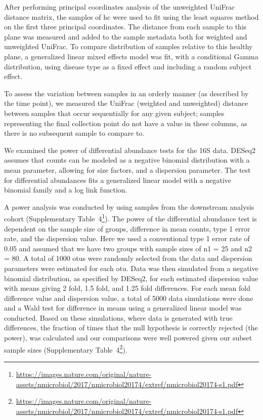 After performing principal coordinates analysis of the unweighted UniFrac distance matrix, the samples of \gls{hc} were used to fit using the least squares method on the first three principal coordinates. The distance from each sample to this plane was measured and added to the sample metadata both for weighted and unweighted UniFrac. To compare distribution of samples relative to this healthy plane, a generalized linear mixed effects model was fit, with a conditional Gamma distribution, using disease type as a fixed effect and including a random subject effect.

To assess the variation between samples in an orderly manner (as described by the time point), we measured the UniFrac (weighted and unweighted) distance between samples that occur sequentially for any given subject; samples representing the final collection point do not have a value in these columns, as there is no subsequent sample to compare to.

We examined the power of differential abundance tests for the 16S data. DESeq2 \cite{Love2014} assumes that counts can be modeled as a negative binomial distribution with a mean parameter, allowing for size factors, and a dispersion parameter. The test for differential abundances fits a generalized linear model with a negative binomial family and a log link function. 

A power analysis was conducted by using samples from the downstream analysis cohort (Supplementary Table~4\footnote{\url{https://images.nature.com/original/nature-assets/nmicrobiol/2017/nmicrobiol20174/extref/nmicrobiol20174-s1.pdf}}). The power of the differential abundance test is dependent on the sample size of groups, difference in mean counts, type 1 error rate, and the dispersion value. Here we used a conventional type 1 error rate of 0.05 and assumed that we have two groups with sample sizes of n1 = 25 and n2 = 80. A total of 1000 \glspl{otu} were randomly selected from the data and dispersion parameters were estimated for each \gls{otu}. Data was then simulated from a negative binomial distribution, as specified by DESeq2, for each estimated dispersion value with means giving 2 fold, 1.5 fold, and 1.25 fold differences. For each mean fold difference value and dispersion value, a total of 5000 data simulations were done and a Wald test for difference in means using a generalized linear model was conducted. Based on these simulations, where data is generated with true differences, the fraction of times that the null hypothesis is correctly rejected (the power), was calculated and our comparisons were well powered given our subset sample sizes (Supplementary  Table~4\footnote{\url{https://images.nature.com/original/nature-assets/nmicrobiol/2017/nmicrobiol20174/extref/nmicrobiol20174-s1.pdf}}). 

